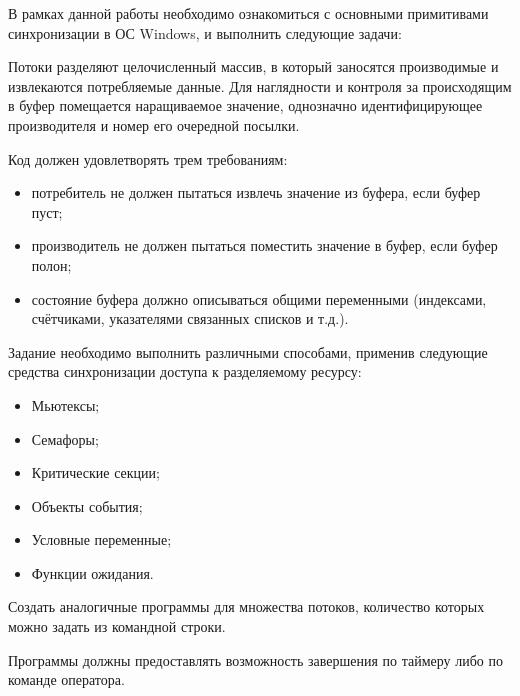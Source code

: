 \documentclass[a4paper, 12pt]{article}		%
\begin{document}
В рамках данной работы необходимо ознакомиться с основными примитивами синхронизации в ОС Windows, и выполнить следующие задачи:
\vspace{3em}

Потоки разделяют целочисленный массив, в который заносятся производимые и извлекаются потребляемые данные. Для наглядности и контроля за происходящим в буфер помещается наращиваемое значение, однозначно идентифицирующее производителя и номер его очередной посылки.

Код должен удовлетворять трем требованиям:
\begin{itemize}
\item потребитель не должен пытаться извлечь значение из буфера, если буфер пуст;
\item производитель не должен пытаться поместить значение в буфер, если буфер полон;
\item состояние буфера должно описываться общими переменными (индексами, счётчиками, указателями связанных списков и т.д.).
\end{itemize}

Задание необходимо выполнить различными способами, применив следующие средства синхронизации доступа к разделяемому ресурсу:
\begin{itemize}
\item Мьютексы;
\item Семафоры;
\item Критические секции;
\item Объекты события;
\item Условные переменные;
\item Функции ожидания.
\end{itemize}

Создать аналогичные программы для множества потоков, количество которых можно задать из командной строки.

Программы должны предоставлять возможность завершения по таймеру либо по команде оператора.
\vspace{3em}
\end{document}

